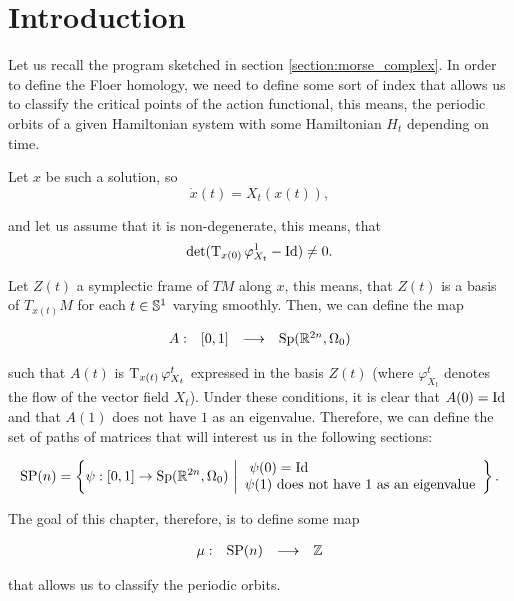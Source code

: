 \section{Introduction}

Let us recall the program sketched in section \ref{section:morse_complex}. In order to define the Floer homology, we need to define some sort of index that allows us to classify the critical points of the action functional, this means, the periodic orbits of a given Hamiltonian system with some Hamiltonian $H_t$ depending on time.

Let $x$ be such a solution, so
\[\dot{x}(t) = X_t(x(t)) ,\]

and let us assume that it is non-degenerate, this means, that
\[\det(\operatorname T_{x(0)} \varphi_{X_t}^1 - \text{Id}) \neq 0 .\]

Let $Z(t)$ a symplectic frame of $TM$ along $x$, this means, that $Z(t)$ is a basis of $T_{x(t)}M$ for each $t \in \mathbb{S}^1$ varying smoothly. Then, we can define the map

\[\begin{array}{rccc} A : & [0,1] & \longrightarrow & \mathrm{Sp}(\mathbb{R}^{2n},\Omega_0) \end{array}\]

such that $A(t)$ is $\operatorname T_{x(t)} \varphi_{X_t}^t$ expressed in the basis $Z(t)$ (where $\varphi_{X_t}^t$ denotes the flow of the vector field $X_t$). Under these conditions, it is clear that $A(0) = \mathrm{Id}$ and that $A(1)$ does not have $1$ as an eigenvalue. Therefore, we can define the set of paths of matrices that will interest us in the following sections:

\[\text{SP}(n) = \left\{ \psi : [0,1] \rightarrow \mathrm{Sp}(\mathbb{R}^{2n},\Omega_0) \ \bigg| \begin{array}{l} \ \psi(0) = \mathrm{Id} \\ \psi(1) \text{ does not have 1 as an eigenvalue} \end{array} \right\} .\]

The goal of this chapter, therefore, is to define some map

\[\begin{array}{rccc} \mu : & \text{SP}(n) & \longrightarrow & \mathbb{Z} \end{array}\]

that allows us to classify the periodic orbits.
